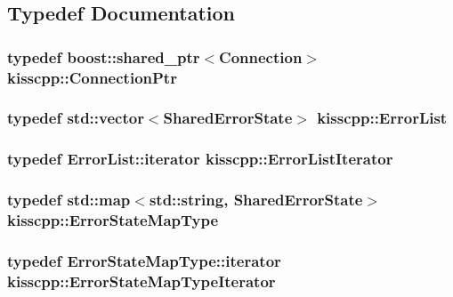 \subsection{Typedef Documentation}
\hypertarget{namespacekisscpp_a4632e92aebdc8fa1c220da260469cbb2}{
\subsubsection[{Connection\-Ptr}]{\setlength{\rightskip}{0pt plus 5cm}typedef boost\-::shared\-\_\-ptr$<${\bf Connection}$>$ {\bf kisscpp\-::\-Connection\-Ptr}}}\label{namespacekisscpp_a4632e92aebdc8fa1c220da260469cbb2}
\hypertarget{namespacekisscpp_aa2a0b418a2607a322f2f821cdfe30c29}{
\subsubsection[{Error\-List}]{\setlength{\rightskip}{0pt plus 5cm}typedef std\-::vector$<${\bf Shared\-Error\-State}$>$ {\bf kisscpp\-::\-Error\-List}}}\label{namespacekisscpp_aa2a0b418a2607a322f2f821cdfe30c29}
\hypertarget{namespacekisscpp_a0e777bb04ad695eccf10fe83263ef220}{
\subsubsection[{Error\-List\-Iterator}]{\setlength{\rightskip}{0pt plus 5cm}typedef Error\-List\-::iterator {\bf kisscpp\-::\-Error\-List\-Iterator}}}\label{namespacekisscpp_a0e777bb04ad695eccf10fe83263ef220}
\hypertarget{namespacekisscpp_ab99725cc511536c050d9cab582313d0c}{
\subsubsection[{Error\-State\-Map\-Type}]{\setlength{\rightskip}{0pt plus 5cm}typedef std\-::map$<$std\-::string, {\bf Shared\-Error\-State}$>$ {\bf kisscpp\-::\-Error\-State\-Map\-Type}}}\label{namespacekisscpp_ab99725cc511536c050d9cab582313d0c}
\hypertarget{namespacekisscpp_a37b3f68e4626dc05d9d2381803a889b4}{
\subsubsection[{Error\-State\-Map\-Type\-Iterator}]{\setlength{\rightskip}{0pt plus 5cm}typedef Error\-State\-Map\-Type\-::iterator {\bf kisscpp\-::\-Error\-State\-Map\-Type\-Iterator}}}\label{namespacekisscpp_a37b3f68e4626dc05d9d2381803a889b4}
